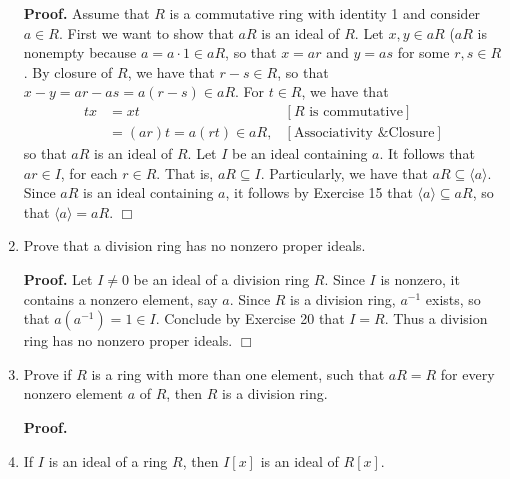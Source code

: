 \documentclass[9pt]{article}
\newcommand{\qed}{\hfill \ensuremath{\Box}}
\newcommand{\cyc}[1]{\langle #1 \rangle}
\begin{document}
\begin{enumerate}
      \textbf{Proof.} Assume that $R$ is a commutative ring with identity 1 and
      consider $a \in R$. First we want to show that $aR$ is an ideal of $R$.
      Let $x, y \in aR$ ($aR$ is nonempty because $a = a \cdot 1 \in aR$, so
      that $x = ar$ and $y = as$ for some $r, s \in R$. By closure of $R$, we
      have that $r - s \in R$, so that $x - y = ar - as = a(r - s) \in aR$. For
      $t \in R$, we have that
      \begin{align*}
         tx &= xt &[R \text{ is commutative}] \\
            &= (ar)t = a(rt) \in aR, &[\text{Associativity \& Closure}]
      \end{align*}
      so that $aR$ is an ideal of $R$. Let $I$ be an ideal containing $a$. It
      follows that $ar \in I$, for each $r \in R$. That is, $aR \subseteq I$.
      Particularly, we have that $aR \subseteq \cyc{a}$. Since $aR$ is an ideal
      containing $a$, it follows by Exercise 15 that $\cyc{a} \subseteq aR$, so
      that $\cyc{a} =aR$. \qed
   \item Prove that a division ring has no nonzero proper ideals.
         
      \textbf{Proof.} Let $I \neq 0$ be an ideal of a division ring $R$. Since
      $I$ is nonzero, it contains a nonzero element, say $a$. Since $R$ is a
      division ring, $a^{-1}$ exists, so that $a(a^{-1}) = 1 \in I$. Conclude by
      Exercise 20 that $I = R$. Thus a division ring has no nonzero proper
      ideals. \qed
   \item Prove if $R$ is a ring with more than one element, such that $aR = R$
         for every nonzero element $a$ of $R$, then $R$ is a division ring.
         
      \textbf{Proof.}
   \item If $I$ is an ideal of a ring $R$, then $I[x]$ is an ideal of $R[x]$.
         

\end{enumerate}
\end{document}
